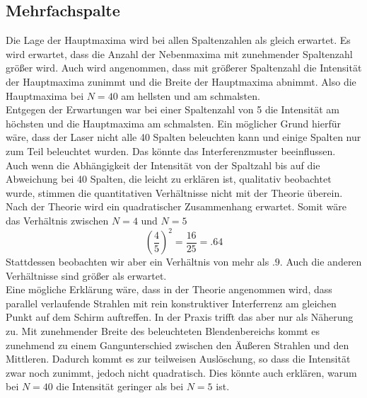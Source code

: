 \subsection{Mehrfachspalte}
Die Lage der Hauptmaxima wird bei allen Spaltenzahlen als gleich erwartet. Es wird erwartet, dass die Anzahl der Nebenmaxima mit zunehmender Spaltenzahl größer wird. Auch wird angenommen, dass mit größerer Spaltenzahl die Intensität der Hauptmaxima zunimmt und die Breite der Hauptmaxima abnimmt. Also die Hauptmaxima bei $ N=40 $ am hellsten und am schmalsten. \\
Entgegen der Erwartungen war bei einer Spaltenzahl von 5 die Intensität am höchsten und die Hauptmaxima am schmalsten.
Ein möglicher Grund hierfür wäre, dass der Laser nicht alle 40 Spalten beleuchten kann und einige Spalten nur zum Teil beleuchtet wurden. Das könnte das Interferenzmuster beeinflussen.\\
Auch wenn die Abhängigkeit der Intensität von der Spaltzahl bis auf die Abweichung bei 40 Spalten, die leicht zu erklären ist, qualitativ beobachtet wurde, stimmen die quantitativen Verhältnisse nicht mit der Theorie überein. Nach der Theorie wird ein quadratischer Zusammenhang erwartet. Somit wäre das Verhältnis zwischen $ N = 4 $ und $ N=5 $ 
\begin{equation*}
	\left(\frac{4}{5}\right)^2 = \frac{16}{25} = \num{,64}
\end{equation*}
Stattdessen beobachten wir aber ein Verhältnis von mehr als $ \num{,9} $. Auch die anderen Verhältnisse sind größer als erwartet. \\
Eine mögliche Erklärung wäre, dass in der Theorie angenommen wird, dass parallel verlaufende Strahlen mit rein konstruktiver Interferrenz am gleichen Punkt auf dem Schirm auftreffen. In der Praxis trifft das aber nur als Näherung zu. Mit zunehmender Breite des beleuchteten Blendenbereichs kommt es zunehmend zu einem Gangunterschied zwischen den Äußeren Strahlen und den Mittleren. Dadurch kommt es zur teilweisen Auslöschung, so dass die Intensität zwar noch zunimmt, jedoch nicht quadratisch. Dies könnte auch erklären, warum bei $ N = 40 $ die Intensität geringer als bei $ N = 5 $ ist.

